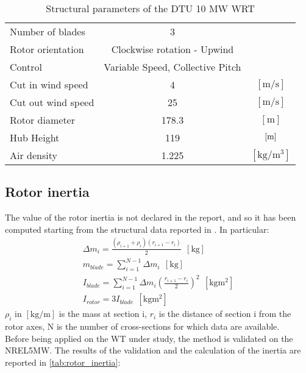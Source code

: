 \begin{table}[htb]
    \caption{Structural parameters of the DTU 10 MW \acrshort{WRT}}
    \centering
    \begin{tabular}{lcc}
    \toprule
    Number of blades & 3 & \\
    Rotor orientation & Clockwise rotation - Upwind & \\
    Control & Variable Speed, Collective Pitch & \\
    Cut in wind speed & 4 & $\left[\si{\meter \per \second}\right]$ \\
    Cut out wind speed & 25 & $\left[\si{\meter \per \second}\right]$ \\
    Rotor diameter & 178.3 & $\left[\si{\meter}\right]$\\
    Hub Height & 119 & $\left[\si{\meter}\right]$\\
    Air density & 1.225 & $\left[\si{\kilo\gram\per\cubic\meter}\right]$\\
    \bottomrule
    \end{tabular}
    \label{tab:DTU_10_struct}
\end{table}

\subsection{Rotor inertia}
The value of the rotor inertia is not declared in the report, and so it has been computed starting from the structural data reported in \cite{DTU_Wind_Energy_Report-I-0092}. In particular:
\begin{gather}
    \Delta m_i=\frac{\left(\rho_{i+1} + \rho_i\right)\left(r_{i+1} - r_i\right)}{2} \ \ \left[\si{\kilo\gram}\right] \\
    m_{blade} = \sum_{i=1}^{N-1}\Delta m_i \ \ \left[\si{\kilo\gram}\right]\\
    I_{blade}=\sum_{i=1}^{N-1}\Delta m_i\left(\frac{r_{i+1} - r_i}{2}\right)^2 \ \ \left[\si{\kilo\gram\square\meter}\right]\\
    I_{rotor}=3I_{blade} \ \ \left[\si{\kilo\gram\square\meter}\right]
\end{gather}
$\rho_i$ in $ \left[\si{\kilo\gram\per\meter}\right]$ is the mass at section i, $r_i$ is the distance of section i from the rotor axes, N is the number of cross-sections for which data are available.\\
Before being applied on the \acrshort{WT} under study, the method is validated on the NREL5MW. The results of the validation and the calculation of the inertia are reported in \autoref{tab:rotor_inertia}:

